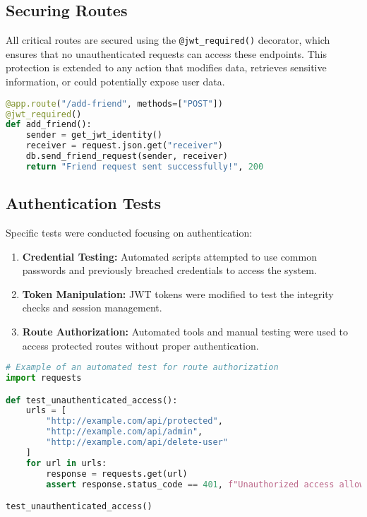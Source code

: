\documentclass{article}
\begin{document}
\subsection*{Securing Routes}
All critical routes are secured using the \texttt{@jwt\_required()} decorator, which ensures that no unauthenticated requests can access these endpoints. This protection is extended to any action that modifies data, retrieves sensitive information, or could potentially expose user data.

\begin{lstlisting}[language=Python]
@app.route("/add-friend", methods=["POST"])
@jwt_required()
def add_friend():
    sender = get_jwt_identity()
    receiver = request.json.get("receiver")
    db.send_friend_request(sender, receiver)
    return "Friend request sent successfully!", 200
\end{lstlisting}

\subsection*{Authentication Tests}
Specific tests were conducted focusing on authentication:

\begin{enumerate}
    \item \textbf{Credential Testing:} Automated scripts attempted to use common passwords and previously breached credentials to access the system.
    \item \textbf{Token Manipulation:} JWT tokens were modified to test the integrity checks and session management.
    \item \textbf{Route Authorization:} Automated tools and manual testing were used to access protected routes without proper authentication.
\end{enumerate}

\begin{lstlisting}[language=Python]
# Example of an automated test for route authorization
import requests

def test_unauthenticated_access():
    urls = [
        "http://example.com/api/protected",
        "http://example.com/api/admin",
        "http://example.com/api/delete-user"
    ]
    for url in urls:
        response = requests.get(url)
        assert response.status_code == 401, f"Unauthorized access allowed for {url}"

test_unauthenticated_access()
\end{lstlisting}
\end{document}
